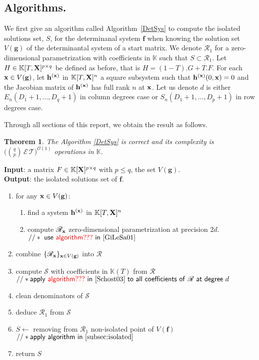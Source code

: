 \documentclass[11pt]{article}
\numberwithin{Property}{section}
\newtheorem{Theorem}{Theorem}%
\numberwithin{Theorem}{section}
\numberwithin{Proposition}{section}
\numberwithin{Lemma}{section}
\numberwithin{Corollary}{section}
\numberwithin{Definition}{section}
\numberwithin{Remark}{section}
\numberwithin{Conjecture}{section}
\numberwithin{Problem}{section}
\numberwithin{Claim}{section}
\theoremstyle{definition}
\numberwithin{Example}{section}
\def\f {\ensuremath{\mathbf{f}}}
\def\h {\ensuremath{\mathbf{h}}}
\def\g {\ensuremath{\mathbf{g}}}
\renewcommand{\leq}{\leqslant}
\newcommand{\bigO}[1]{\mathcal{O}(#1)} %
\newcommand{\field}{\mathbb{K}} %
\newcommand{\mat}[1]{\mathbf{\MakeUppercase{#1}}} %
\newcommand{\todo}[1]{\textcolor{red}{#1}} %
\begin{document}
\subsection{Algorithms.} We first give an algorithm called Algorithm~\ref{DetSys} to compute the isolated solutions set, $S$,  for the determinanal system $\f$ when knowing the solution set $V(\g)$ of the determinantal system of a start matrix. We denote $\mathscr{R}_{1}$ for a zero-dimensional parametrization with coefficients in $\field$ such that $S \subset \mathscr{R}_{1}$. Let $H \in \field[T, \mat{X}]^{p \times q}$ be defined as before, that is $H = (1 - T).G + T.F$. For each ${\bf x} \in V(\g)$, let $\h^{(\bf x)}$ in $\field[T,\mat{X}]^n$ a square subsystem such that $\h^{(\bf x)}(0,{\bf x}) = 0$ and the Jacobian matrix of $\h^{(\bf x)}$ has full rank $n$ at ${\bf x}$. Let us denote $d$ is either $E_{n}(D_1+1, \ldots, D_q+1)$ in column degrees case or $S_{n}(D_1+1, \ldots, D_p+1)$ in row degrees case. 

Through all sections of this report, we obtain the result as follows.
\begin{Theorem}
The Algorithm \ref{DetSys} is correct and its complexity is $\big({{q}\choose{p}} \,\mathcal{E}\,\mathcal{T}\big)^{\bigO{1}}$ operations in $\field$.
\end{Theorem}
\begin{algorithm}
\caption{$\mathsf{Determinantal System}$}
\label{DetSys}
{\bf Input}: a matrix $F \in \field[\mat{X}]^{p \times q}$ with $p \leq q$, the set $V(\g)$.\\
{\bf Output}: the isolated solutions set of $\f$. 
\begin{enumerate}
\item for any ${\bf x} \in V(\g)$: 
\begin{enumerate}
\item find a system $\h^{(\bf x)}$ in $\field[T,\mat{X}]^n$
\item compute $\mathscr{R}_{\bf x}$ zero-dimensional parametrization at precision $2d$. \\
$\mathsf{//* \ use \ \todo{algorithm???} \ in~\cite{GiLeSa01} \ }$
\end{enumerate}
\item combine $\{\mathscr{R}_{\bf x}\}_{{\bf x} \in V(\g)}$ into $\mathscr{R}$
\item compute $\mathscr{S}$ with coefficients in $\field(T)$ from  $\mathscr{R}$\\
$\mathsf{//* apply \ \todo{algorithm???} \ in~\cite{Schost03} \ to \ all \ coefficients \ of \ \mathscr{R} \ at \ degree} \ d$
\item clean denominators of $\mathscr{S}$
\item deduce $\mathscr{R}_{1}$ from $\mathscr{S}$
\item  $S \gets$ removing from $\mathscr{R}_{1}$ non-isolated point of $V(\f)$\\
$\mathsf{//* apply \ algorithm \ in~\cref{subsec:isolated}}$
\item return $S$
\end{enumerate}
\end{algorithm}
\end{document}

